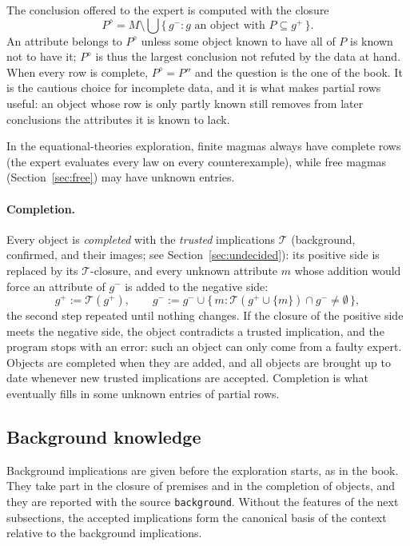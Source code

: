 \documentclass[11pt,a4paper]{article}
\theoremstyle{definition}
\theoremstyle{remark}
\newcommand{\code}[1]{\texttt{#1}}
\newcommand{\pos}{^{+}}
\newcommand{\nega}{^{-}}
\begin{document}
The conclusion offered to the expert is computed with the closure
\[
  P^{\diamond} = M \setminus \bigcup \{\, g\nega : g \text{ an object with } P \subseteq g\pos \,\}.
\]
An attribute belongs to $P^{\diamond}$ unless some object known to have all of $P$ is known not to have it; $P^{\diamond}$ is thus the largest conclusion not refuted by the data at hand. When every row is complete, $P^{\diamond} = P''$ and the question is the one of the book. It is the cautious choice for incomplete data, and it is what makes partial rows useful: an object whose row is only partly known still removes from later conclusions the attributes it is known to lack.

In the equational-theories exploration, finite magmas always have complete rows (the expert evaluates every law on every counterexample), while free magmas (Section~\ref{sec:free}) may have unknown entries.

\paragraph{Completion.}
Every object is \emph{completed} with the \emph{trusted} implications $\mathcal{T}$ (background, confirmed, and their images; see Section~\ref{sec:undecided}): its positive side is replaced by its $\mathcal{T}$-closure, and every unknown attribute $m$ whose addition would force an attribute of $g\nega$ is added to the negative side:
\[
  g\pos := \mathcal{T}(g\pos), \qquad
  g\nega := g\nega \cup \{\, m : \mathcal{T}(g\pos \cup \{m\}) \cap g\nega \neq \emptyset \,\},
\]
the second step repeated until nothing changes. If the closure of the positive side meets the negative side, the object contradicts a trusted implication, and the program stops with an error: such an object can only come from a faulty expert. Objects are completed when they are added, and all objects are brought up to date whenever new trusted implications are accepted. Completion is what eventually fills in some unknown entries of partial rows.

\subsection{Background knowledge}\label{sec:bgknowledge}

Background implications are given before the exploration starts, as in the book. They take part in the closure of premises and in the completion of objects, and they are reported with the source \code{background}. Without the features of the next subsections, the accepted implications form the canonical basis of the context relative to the background implications.
\end{document}

